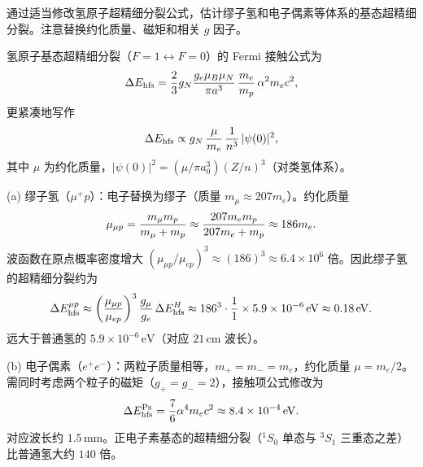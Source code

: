 \begin{question}
通过适当修改氢原子超精细分裂公式，估计缪子氢和电子偶素等体系的基态超精细分裂。注意替换约化质量、磁矩和相关 $g$ 因子。
\end{question}
\begin{solution}
氢原子基态超精细分裂（$F=1\leftrightarrow F=0$）的 Fermi 接触公式为
\[
\Delta E_{\rm hfs} = {2\over3}g_N{g_e\mu_B\mu_N\over\pi a^3}\,{m_e\over m_p}\,\alpha^2 m_e c^2,
\]
更紧凑地写作
\[
\Delta E_{\rm hfs} \propto g_N\,{\mu\over m_e}\,{1\over n^3}\,|\psi(0)|^2,
\]
其中 $\mu$ 为约化质量，$|\psi(0)|^2=(\mu/\pi a_0^3)(Z/n)^3$（对类氢体系）。

(a) 缪子氢（$\mu^+p$）：电子替换为缪子（质量 $m_\mu\approx207 m_e$）。约化质量
\[
\mu_{\mu p} = {m_\mu m_p\over m_\mu+m_p} \approx {207 m_e m_p\over 207 m_e+m_p} \approx 186 m_e.
\]
波函数在原点概率密度增大 $(\mu_{\mu p}/\mu_{ep})^3 \approx (186)^3 \approx 6.4\times10^6$ 倍。因此缪子氢的超精细分裂约为
\[
\Delta E_{\rm hfs}^{\mu p} \approx \left({\mu_{\mu p}\over\mu_{ep}}\right)^3 {g_\mu\over g_e}\,\Delta E_{\rm hfs}^{H} \approx 186^3\cdot{1\over1}\times 5.9\times10^{-6}\,\mathrm{eV} \approx 0.18\,\mathrm{eV}.
\]
远大于普通氢的 $5.9\times10^{-6}\,\mathrm{eV}$（对应 $21\,\mathrm{cm}$ 波长）。

(b) 电子偶素（$e^+e^-$）：两粒子质量相等，$m_+=m_-=m_e$，约化质量 $\mu=m_e/2$。需同时考虑两个粒子的磁矩（$g_+=g_-=2$），接触项公式修改为
\[
\Delta E_{\rm hfs}^{\rm Ps} = {7\over6}\alpha^4 m_e c^2 \approx 8.4\times10^{-4}\,\mathrm{eV}.
\]
对应波长约 $1.5\,\mathrm{mm}$。正电子素基态的超精细分裂（$^1S_0$ 单态与 $^3S_1$ 三重态之差）比普通氢大约 $140$ 倍。
\end{solution}

